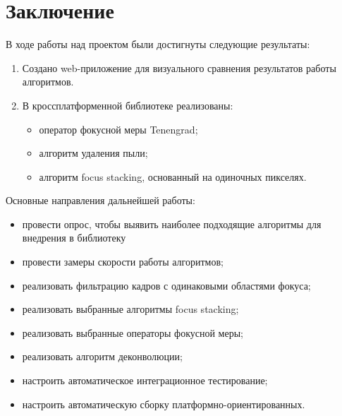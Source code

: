 \documentclass[14pt]{matmex-diploma-custom}
\begin{document}
\section*{Заключение}
В ходе работы над проектом были достигнуты следующие результаты:
\begin{enumerate}
    \item Создано web-приложение для визуального сравнения результатов работы алгоритмов. 
    \item В кроссплатформенной библиотеке реализованы:
        \begin{itemize}
            \item оператор фокусной меры Tenengrad;
            \item алгоритм удаления пыли;
            \item алгоритм focus stacking, основанный на одиночных пикселях.
        \end{itemize}
\end{enumerate}

\par
Основные направления дальнейшей работы:
\begin{itemize}
    \item провести опрос, чтобы выявить наиболее подходящие алгоритмы для внедрения в библиотеку
    \item провести замеры скорости работы алгоритмов;
    \item реализовать фильтрацию кадров с одинаковыми областями фокуса;
    \item реализовать выбранные алгоритмы focus stacking;
    \item реализовать выбранные операторы фокусной меры;
    \item реализовать алгоритм деконволюции;
    \item настроить автоматическое интеграционное тестирование;
    \item настроить автоматическую сборку платформно-ориентированных.
\end{itemize}

\setmonofont[Mapping=tex-text]{CMU Typewriter Text}


\end{document}
